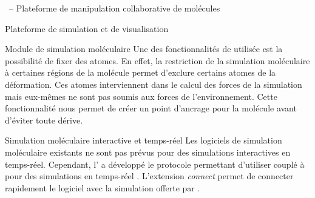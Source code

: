 \documentclass[myfrancais,ngerman,english,french]{mythesis}
\begin{document}
\begin{mychapter}{\myShaddock\ -- Plateforme de manipulation collaborative de molécules}
\begin{mysection}{Plateforme de simulation et de visualisation}
\begin{mysubsection}{Module de simulation moléculaire}
				Une des fonctionnalités de  utilisée est la possibilité de \og fixer \fg des atomes.
				En effet, la restriction de la simulation moléculaire à certaines régions de la molécule permet d'exclure certains atomes de la déformation.
				Ces atomes interviennent dans le calcul des forces de la simulation mais eux-mêmes ne sont pas soumis aux forces de l'environnement.
				Cette fonctionnalité nous permet de créer un point d'ancrage pour la molécule avant d'éviter toute dérive.
				\begin{mysubsubsection}{Simulation moléculaire interactive et temps-réel}
					Les logiciels de simulation moléculaire existants ne sont pas prévus pour des simulations interactives en temps-réel.
					Cependant, l' a développé le protocole  permettant d'utiliser  couplé à  pour des simulations en temps-réel .
					L'extension \textit{ connect} permet de connecter rapidement le logiciel  avec la simulation offerte par .


\end{mysubsubsection}
\end{mysubsection}
\end{mysection}
\end{mychapter}
\end{document}
